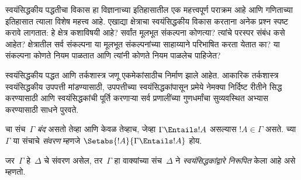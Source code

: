 \documentclass[../../../include/open-logic-section]{subfiles}
\begin{document}

\begin{explain}
स्वयंसिद्धकीय पद्धतीचा विकास हा विज्ञानाच्या इतिहासातील एक महत्त्वपूर्ण
पराक्रम आहे आणि गणिताच्या इतिहासात त्याला विशेष महत्त्व आहे. एखाद्या
क्षेत्राचा स्वयंसिद्धकीय विकास करताना अनेक प्रश्न स्पष्ट करावे लागतात: हे
क्षेत्र कशाविषयी आहे? सर्वांत मूलभूत संकल्पना कोणत्या? त्यांचे परस्पर संबंध
कसे आहेत? क्षेत्रातील सर्व संकल्पना या मूलभूत संकल्पनांच्या साहाय्याने
परिभाषित करता येतात का? या संकल्पना कोणते नियम पाळतात आणि त्यांनी कोणते
नियम पाळलेच पाहिजेत?

स्वयंसिद्धकीय पद्धत आणि तर्कशास्त्र जणू एकमेकांसाठीच निर्माण झाले आहेत.
आकारिक तर्कशास्त्र स्वयंसिद्धकीय उपपत्ती मांडण्यासाठी, उपपत्तीच्या
स्वयंसिद्धकांपासून प्रमेये नेमक्या निर्दिष्ट रीतीने सिद्ध करण्यासाठी आणि
स्वयंसिद्धकांची पूर्ति करणाऱ्या सर्व प्रणालींच्या गुणधर्मांचा सुव्यवस्थित
अभ्यास करण्यासाठी साधने पुरवते.
\end{explain}

\begin{defn}
चा संच~$\Gamma$ \emph{बंद} असतो तेव्हा आणि केवळ तेव्हाच,
जेव्हा $\Gamma \Entails !A$ असल्यास $!A \in \Gamma$ असते.
च्या $\Gamma$ या संचाचे \emph{संवरण} म्हणजे
$\Setabs{!A}{\Gamma \Entails !A}$ होय.

जर~$\Gamma$ हे~$\Delta$ चे संवरण असेल, तर~$\Gamma$ हा वाक्यांच्या
संच~$\Delta$ ने \emph{स्वयंसिद्धकांद्वारे निरूपित} केला आहे असे म्हणतो.
\end{defn}
\end{document}
